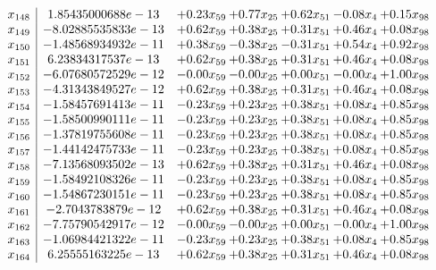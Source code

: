 \documentclass[8pt]{article}
\begin{document}
\[\begin{array}{c| c c@{\hskip 2pt} c@{\hskip 2pt} c@{\hskip 2pt} c@{\hskip 2pt} c@{\hskip 2pt} }
 x_{148}   &  1.85435000688e-13 & +  0.23 x_{59} & +  0.77 x_{25} & +  0.62 x_{51} & -0.08 x_{4} & +  0.15 x_{98}\\
 x_{149}   &  -8.02885535833e-13 & +  0.62 x_{59} & +  0.38 x_{25} & +  0.31 x_{51} & +  0.46 x_{4} & +  0.08 x_{98}\\
 x_{150}   &  -1.48568934932e-11 & +  0.38 x_{59} & -0.38 x_{25} & -0.31 x_{51} & +  0.54 x_{4} & +  0.92 x_{98}\\
 x_{151}   &  6.23834317537e-13 & +  0.62 x_{59} & +  0.38 x_{25} & +  0.31 x_{51} & +  0.46 x_{4} & +  0.08 x_{98}\\
 x_{152}   &  -6.07680572529e-12 & -0.00 x_{59} & -0.00 x_{25} & +  0.00 x_{51} & -0.00 x_{4} & +  1.00 x_{98}\\
 x_{153}   &  -4.31343849527e-12 & +  0.62 x_{59} & +  0.38 x_{25} & +  0.31 x_{51} & +  0.46 x_{4} & +  0.08 x_{98}\\
 x_{154}   &  -1.58457691413e-11 & -0.23 x_{59} & +  0.23 x_{25} & +  0.38 x_{51} & +  0.08 x_{4} & +  0.85 x_{98}\\
 x_{155}   &  -1.58500990111e-11 & -0.23 x_{59} & +  0.23 x_{25} & +  0.38 x_{51} & +  0.08 x_{4} & +  0.85 x_{98}\\
 x_{156}   &  -1.37819755608e-11 & -0.23 x_{59} & +  0.23 x_{25} & +  0.38 x_{51} & +  0.08 x_{4} & +  0.85 x_{98}\\
 x_{157}   &  -1.44142475733e-11 & -0.23 x_{59} & +  0.23 x_{25} & +  0.38 x_{51} & +  0.08 x_{4} & +  0.85 x_{98}\\
 x_{158}   &  -7.13568093502e-13 & +  0.62 x_{59} & +  0.38 x_{25} & +  0.31 x_{51} & +  0.46 x_{4} & +  0.08 x_{98}\\
 x_{159}   &  -1.58492108326e-11 & -0.23 x_{59} & +  0.23 x_{25} & +  0.38 x_{51} & +  0.08 x_{4} & +  0.85 x_{98}\\
 x_{160}   &  -1.54867230151e-11 & -0.23 x_{59} & +  0.23 x_{25} & +  0.38 x_{51} & +  0.08 x_{4} & +  0.85 x_{98}\\
 x_{161}   &  -2.7043783879e-12 & +  0.62 x_{59} & +  0.38 x_{25} & +  0.31 x_{51} & +  0.46 x_{4} & +  0.08 x_{98}\\
 x_{162}   &  -7.75790542917e-12 & -0.00 x_{59} & -0.00 x_{25} & +  0.00 x_{51} & -0.00 x_{4} & +  1.00 x_{98}\\
 x_{163}   &  -1.06984421322e-11 & -0.23 x_{59} & +  0.23 x_{25} & +  0.38 x_{51} & +  0.08 x_{4} & +  0.85 x_{98}\\
 x_{164}   &  6.25555163225e-13 & +  0.62 x_{59} & +  0.38 x_{25} & +  0.31 x_{51} & +  0.46 x_{4} & +  0.08 x_{98}\\

\end{array}\]
\end{document}
